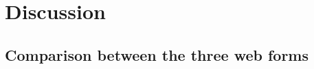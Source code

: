 \documentclass[../main/Replicate.tex]{subfiles}
\begin{document}
\section{Discussion}
	\subsection{Comparison between the three web forms}
%	
\end{document}
